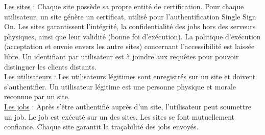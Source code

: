 \underline{Les sites} : Chaque site possède sa propre entité de certification. Pour chaque utilisateur, un site génère un certificat, utilisé pour l’authentification Single Sign On. Les sites garantissent l’intégrité, la confidentialité des jobs hors des serveurs physiques, ainsi que leur validité (bonne foi d'exécution). La politique d'exécution (acceptation et envoie envers les autre sites) concernant l’accessibilité est laissée libre. Un identifiant par utilisateur est à joindre aux requêtes pour pouvoir distinguer les clients distants. \\

\underline{Les utilisateurs} : Les utilisateurs légitimes sont enregistrés sur un site et doivent s'authentifier. Un utilisateur légitime est une personne physique et morale reconnue par un site. \\

\underline{Les jobs} : Après s’être authentifié auprès d’un site, l’utilisateur peut soumettre un job. Le job est exécuté sur un des sites. Les sites se font mutuellement confiance. Chaque site garantit la traçabilité des jobs envoyés.
